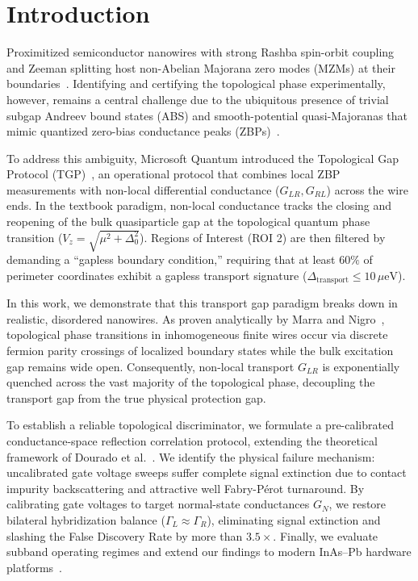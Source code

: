 \documentclass[aps,prb,reprint,superscriptaddress,amsmath,amssymb,floatfix]{revtex4-2}
\begin{document}
\maketitle

\section{Introduction}

Proximitized semiconductor nanowires with strong Rashba spin-orbit coupling and Zeeman splitting host non-Abelian Majorana zero modes (MZMs) at their boundaries~\cite{Lutchyn2010,Oreg2010,Sau2010,Stanescu2013}. Identifying and certifying the topological phase experimentally, however, remains a central challenge due to the ubiquitous presence of trivial subgap Andreev bound states (ABS) and smooth-potential quasi-Majoranas that mimic quantized zero-bias conductance peaks (ZBPs)~\cite{Aghaee2023,Dourado2024}.

To address this ambiguity, Microsoft Quantum introduced the Topological Gap Protocol (TGP)~\cite{Aghaee2023}, an operational protocol that combines local ZBP measurements with non-local differential conductance ($G_{LR}, G_{RL}$) across the wire ends. In the textbook paradigm, non-local conductance tracks the closing and reopening of the bulk quasiparticle gap at the topological quantum phase transition ($V_z = \sqrt{\mu^2 + \Delta_0^2}$). Regions of Interest (ROI 2) are then filtered by demanding a ``gapless boundary condition,'' requiring that at least $60\%$ of perimeter coordinates exhibit a gapless transport signature ($\Delta_{\mathrm{transport}} \le 10\,\mu\text{eV}$).

In this work, we demonstrate that this transport gap paradigm breaks down in realistic, disordered nanowires. As proven analytically by Marra and Nigro~\cite{Marra2022}, topological phase transitions in inhomogeneous finite wires occur via discrete fermion parity crossings of localized boundary states while the bulk excitation gap remains wide open. Consequently, non-local transport $G_{LR}$ is exponentially quenched across the vast majority of the topological phase, decoupling the transport gap from the true physical protection gap.

To establish a reliable topological discriminator, we formulate a pre-calibrated conductance-space reflection correlation protocol, extending the theoretical framework of Dourado et al.~\cite{Dourado2024,Dourado2025}. We identify the physical failure mechanism: uncalibrated gate voltage sweeps suffer complete signal extinction due to contact impurity backscattering and attractive well Fabry-P\'erot turnaround. By calibrating gate voltages to target normal-state conductances $G_N$, we restore bilateral hybridization balance ($\Gamma_L \approx \Gamma_R$), eliminating signal extinction and slashing the False Discovery Rate by more than $3.5\times$. Finally, we evaluate subband operating regimes and extend our findings to modern InAs--Pb hardware platforms~\cite{Aghaee2026}.
\end{document}
